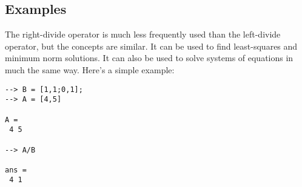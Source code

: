 \subsection{Examples}

The right-divide operator is much less frequently used than the left-divide operator, but the concepts are similar.  It can be used to find least-squares and minimum norm solutions.  It can also be used to solve systems of equations in much the same way.  Here's a simple example:
\begin{verbatim}
--> B = [1,1;0,1];
--> A = [4,5]

A = 
 4 5 

--> A/B

ans = 
 4 1 
\end{verbatim}
